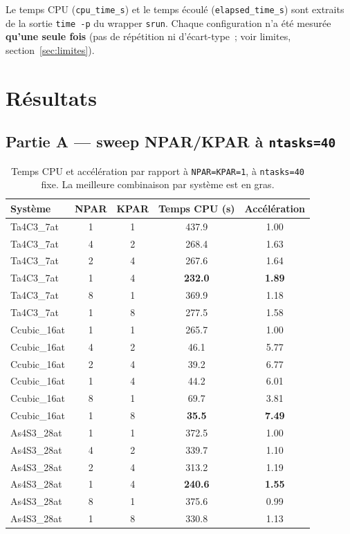 \documentclass[11pt,a4paper]{article}
\begin{document}
Le temps CPU (\texttt{cpu\_time\_s}) et le temps écoulé (\texttt{elapsed\_time\_s}) sont extraits de
la sortie \texttt{time -p} du wrapper \texttt{srun}. Chaque configuration n'a été mesurée
\textbf{qu'une seule fois} (pas de répétition ni d'écart-type~; voir limites,
section~\ref{sec:limites}).

\section{Résultats}

\subsection{Partie A --- sweep NPAR/KPAR à \texttt{ntasks=40}}

\begin{table}[h]
\centering
\begin{tabular}{lccS[table-format=3.1]S[table-format=1.2]}
\toprule
Système & NPAR & KPAR & {Temps CPU (s)} & {Accélération} \\
\midrule
Ta4C3\_7at   & 1 & 1 & 437.9 & 1.00 \\
Ta4C3\_7at   & 4 & 2 & 268.4 & 1.63 \\
Ta4C3\_7at   & 2 & 4 & 267.6 & 1.64 \\
Ta4C3\_7at   & 1 & 4 & \bfseries 232.0 & \bfseries 1.89 \\
Ta4C3\_7at   & 8 & 1 & 369.9 & 1.18 \\
Ta4C3\_7at   & 1 & 8 & 277.5 & 1.58 \\
\midrule
Ccubic\_16at & 1 & 1 & 265.7 & 1.00 \\
Ccubic\_16at & 4 & 2 & 46.1  & 5.77 \\
Ccubic\_16at & 2 & 4 & 39.2  & 6.77 \\
Ccubic\_16at & 1 & 4 & 44.2  & 6.01 \\
Ccubic\_16at & 8 & 1 & 69.7  & 3.81 \\
Ccubic\_16at & 1 & 8 & \bfseries 35.5  & \bfseries 7.49 \\
\midrule
As4S3\_28at  & 1 & 1 & 372.5 & 1.00 \\
As4S3\_28at  & 4 & 2 & 339.7 & 1.10 \\
As4S3\_28at  & 2 & 4 & 313.2 & 1.19 \\
As4S3\_28at  & 1 & 4 & \bfseries 240.6 & \bfseries 1.55 \\
As4S3\_28at  & 8 & 1 & 375.6 & 0.99 \\
As4S3\_28at  & 1 & 8 & 330.8 & 1.13 \\
\bottomrule
\end{tabular}
\caption{Temps CPU et accélération par rapport à \texttt{NPAR=KPAR=1}, à \texttt{ntasks=40} fixe.
La meilleure combinaison par système est en gras.}
\label{tab:partA}
\end{table}
\end{document}
